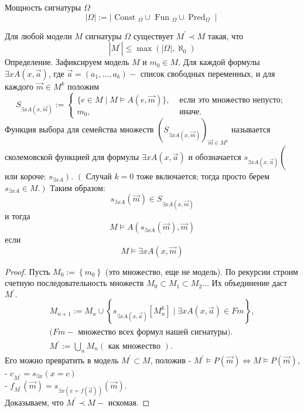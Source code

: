 Мощность сигнатуры $\Omega$
$$
|\Omega|:=\mid \text { Const }_{\Omega} \cup \text { Fun }_{\Omega} \cup \operatorname{Pred}_{\Omega} \mid
$$
\begin{theo}
Для любой модели $M$ сигнатуры $\Omega$ существует $M^{\prime} \prec M$ такая, что
$$
\left|M^{\prime}\right| \leq \max \left(|\Omega|, \aleph_{0}\right)
$$
Определение. Зафиксируем модель $M$ и $m_{0} \in M .$ Для каждой формулы $\exists x A(x, \vec{a})$, где $\vec{a}=\left(a_{1}, \ldots, a_{k}\right)-$ список свободных переменных, и для каждого $\vec{m} \in M^{k}$ положим
$$
S_{\exists x A(x, \vec{m})}:=\left\{\begin{array}{ll}
\{e \in M \mid M \vDash A(e, \vec{m})\}, & \text { если это множество непусто; } \\
m_{0}, & \text { иначе. }
\end{array}\right.
$$
Функция выбора для семейства множеств $\left(S_{\exists x A(x, \vec{m})}\right)_{\vec{m} \in M^{k}}$ называется сколемовской функцией для формулы $\exists x A(x, \vec{a})$ и обозначается $s_{\exists x A(x, \vec{a})}\left(\right.$ или короче: $\left.s_{\exists x A}\right) .$ $\left(\right.$ Случай $k=0$ тоже включается; тогда просто берем $\left.s_{\exists x A} \in M .\right)$
Таким образом:
$$
s_{\exists x A}(\vec{m}) \in S_{\exists x A(x, \vec{m})}
$$
и тогда
$$
M \vDash A\left(s_{\exists x A}(\vec{m}), \vec{m}\right)
$$
если
$$
M \vDash \exists x A(x, \vec{m})
$$
\end{theo}
\begin{proof}
Пусть $M_{0}:=\left\{m_{0}\right\}$ (это множество, еще не модель). По рекурсии строим счетную последовательность множеств $M_{0} \subset M_{1} \subset M_{2} \ldots$ Их объединение даст $M^{\prime} .$
$$
\begin{array}{l}
M_{n+1}:=M_{n} \cup\left\{s_{\exists x A(x, \vec{a})}\left[M_{n}^{k}\right] \mid \exists x A(x, \vec{a}) \in F m\right\}, \\
(F m-\text { множество всех формул нашей сигнатуры). } \\
M^{\prime}:=\bigcup_{n} M_{n}(\text { как множество }) .
\end{array}
$$
Его можно превратить в модель $M^{\prime} \subset M$, положив
- $M^{\prime} \vDash P(\vec{m}) \Leftrightarrow M \vDash P(\vec{m})$,\\
- $c_{M^{\prime}}=s_{\exists x}(x=c)$\\
- $f_{M^{\prime}}(\vec{m})=s_{\exists x(x=f(\vec{a}))}(\vec{m}) .$\\
Доказываем, что $M^{\prime} \prec M-$ искомая.
\end{proof}